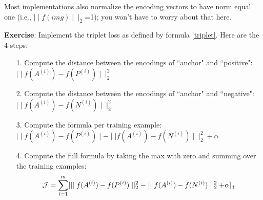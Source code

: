 Most implementations also normalize the encoding vectors  to have norm equal one (i.e., $\mid \mid f(img)\mid \mid_2$=1); you won't have to worry about that here.

{\textbf {Exercise}}: Implement the triplet loss as defined by formula \eqref{triplet}. Here are the 4 steps:
\begin{itemize}
\item[1.] Compute the distance between the encodings of ``anchor" and ``positive": $\mid \mid f(A^{(i)}) - f(P^{(i)}) \mid \mid_2^2$
\item[2.] Compute the distance between the encodings of ``anchor" and ``negative": $\mid \mid f(A^{(i)}) - f(N^{(i)}) \mid \mid_2^2$
\item[3.] Compute the formula per training example: $ \mid \mid f(A^{(i)}) - f(P^{(i)}) \mid - \mid \mid f(A^{(i)}) - f(N^{(i)}) \mid \mid_2^2 + \alpha$
\item[4.] Compute the full formula by taking the max with zero and summing over the training examples:
\begin{equation*}
\mathcal{J} = \sum^{m}_{i=1} \large[ \small \mid \mid f(A^{(i)}) - f(P^{(i)}) \mid \mid_2^2 - \mid \mid f(A^{(i)}) - f(N^{(i)}) \mid \mid_2^2+ \alpha \large ] \small_+
\end{equation*}
\end{itemize}

